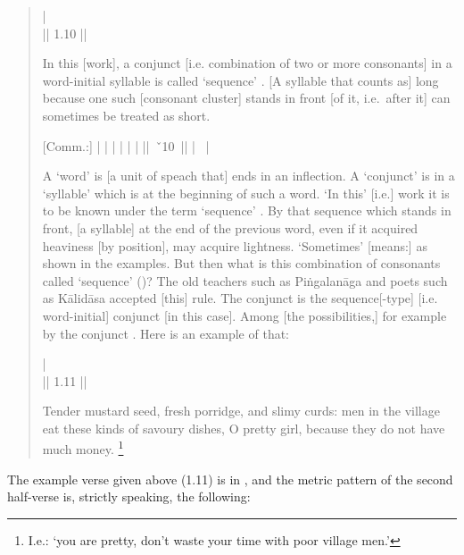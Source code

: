 \begin{quote}
 | \\
 || 1.10 ||

In this [work], a conjunct [i.e. combination of two or more consonants]
 in a word-initial syllable  is
called `sequence' . [A syllable that counts as] long because one
such [consonant cluster] stands in front [of it, i.e.\ after it] can 
sometimes be treated as short.

{\footnotesize [Comm.:] 
 |
 |
 | 
 | 
 | 
 |
||~ˇ10~||
 | 
~|

A `word' is [a unit of speach that] ends in an inflection. 
A `conjunct' is in a `syllable' which is
at the beginning of such a word. 
`In this' [i.e.] work it is to be known under the 
term `sequence' . By that sequence which stands in front, 
[a syllable] at the end of the previous word, even if it acquired
heaviness [by position], may acquire lightness. `Sometimes' [means:]
as shown in the examples.
But then what is this combination of consonants called `sequence'
()?
The old teachers such as Piṅgalanāga and poets such as Kālidāsa
accepted [this] rule. The conjunct 
is the sequence[-type]  [i.e. word-initial]
conjunct  [in this case].
Among [the possibilities,] for example by the conjunct
.
Here is an example of that:}

 |\\
 || 1.11 ||

Tender mustard seed, fresh porridge, and slimy curds: men in the village eat
these kinds of savoury dishes, O pretty girl, because they do not have
much money.%
	\footnote{I.e.: `you are pretty, don't waste your time with poor village men.'}
\end{quote}

\noindent
The example verse given above (1.11) is in , and the
metric pattern of the second half-verse is, strictly speaking, the following:
 
